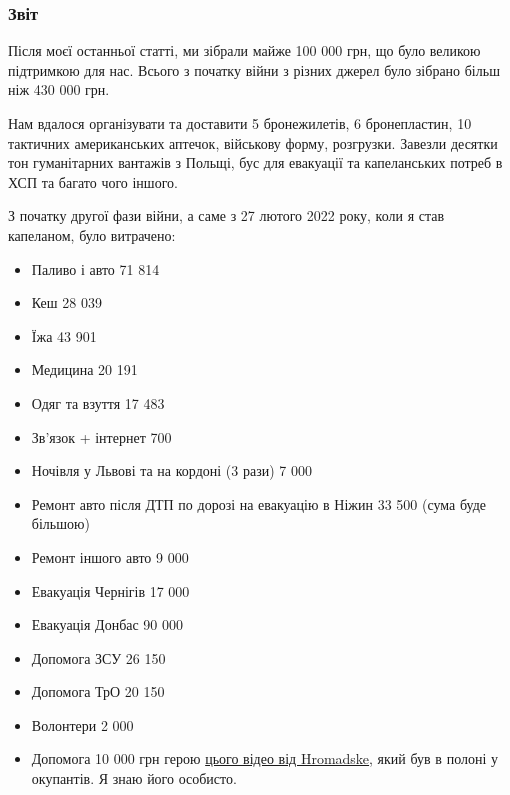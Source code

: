  
 
 
 
 

\subsubsection{Звіт}

Після моєї останньої статті, ми зібрали майже 100 000 грн, що було великою
підтримкою для нас. Всього з початку війни з різних джерел було зібрано більш
ніж 430 000 грн.

Нам вдалося організувати та доставити 5 бронежилетів, 6 бронепластин, 10
тактичних американських аптечок, військову форму, розгрузки. Завезли десятки
тон гуманітарних вантажів з Польщі, бус для евакуації та капеланських потреб в
ХСП та багато чого іншого.

З початку другої фази війни, а саме з 27 лютого 2022 року, коли я став
капеланом, було витрачено:

\begin{itemize} %
\item Паливо і авто 71 814
\item Кеш 28 039
\item Їжа 43 901
\item Медицина 20 191
\item Одяг та взуття 17 483
\item Зв'язок + інтернет 700
\item Ночівля у Львові та на кордоні (3 рази) 7 000
\item Ремонт авто після ДТП по дорозі на евакуацію в Ніжин 33 500 (сума буде більшою)
\item Ремонт іншого авто 9 000
\item Евакуація Чернігів 17 000
\item Евакуація Донбас 90 000
\item Допомога ЗСУ 26 150
\item Допомога ТрО 20 150
\item Волонтери 2 000
\item Допомога 10 000 грн герою \href{https://youtu.be/HPqmJA3MbU0}{цього відео від Hromadske}, який був в полоні у окупантів. Я знаю його особисто.
\end{itemize} %

